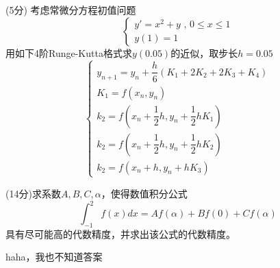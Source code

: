 \documentclass[12pt,letter]{ustcexam}
\begin{document}
\begin{problems}
\newpage

\qu (5分) 考虑常微分方程初值问题
$$ \left\{\begin{array}{l}y'=x^2+y \mbox{  ,  } 0\leqslant x\leqslant 1 \\
y(1)=1
\end{array}\right.$$
用如下4阶Runge-Kutta格式求$y(0.05)$的近似，取步长$h=0.05$
$$
\left\{\begin{array}{l}
y_{n+1}=y_n+\dfrac{h}{6}(K_1+2K_2+2K_3+K_4) \\
K_1=f(x_n,y_n) \\
k_2=f(x_n+\dfrac{1}{2}h,y_n+\dfrac{1}{2}hK_1) \\
k_2=f(x_n+\dfrac{1}{2}h,y_n+\dfrac{1}{2}hK_2) \\
k_2=f(x_n+h,y_n+hK_3)
\end{array}\right.
$$


\vspace*{0.25\textheight}

\newpage

\qu (14分)求系数$A,B,C,\alpha$，使得数值积分公式
$$
  \int_{-1}^2f(x)dx=Af(\alpha)+Bf(0)+Cf(\alpha)
$$
具有尽可能高的代数精度，并求出该公式的代数精度。
\begin{sol}
haha，我也不知道答案
\end{sol}

\newpage

\end{problems}


\clearpage
{}
\clearpage

\end{document}
